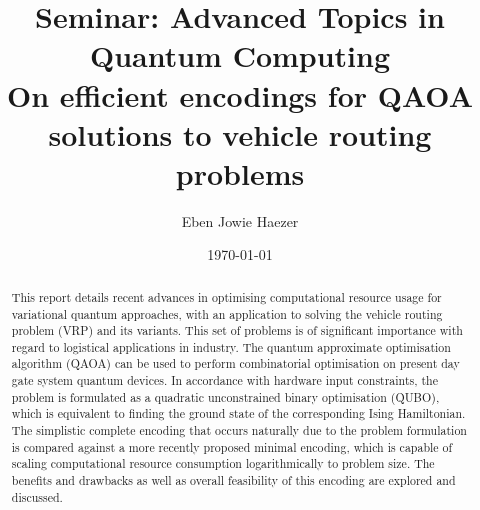 \documentclass [10pt]{article}
\title {
	{\Large Seminar: Advanced Topics in Quantum Computing \\}
	\vspace {0.4cm}
	On efficient encodings for QAOA \\
	solutions to vehicle routing problems
}
\author {Eben Jowie Haezer}
\date {\today}
\begin{document}
\vspace* {-1.8cm}
{\let \newpage \relax \maketitle}

\begin {abstract}
This report details recent advances in optimising computational resource usage
for variational quantum approaches, with an application to solving the vehicle
routing problem (VRP) and its variants. This set of problems is of significant
importance with regard to logistical applications in industry. The quantum
approximate optimisation algorithm (QAOA) can be used to perform combinatorial
optimisation on present day gate system quantum devices. In accordance with
hardware input constraints, the problem is formulated as a quadratic
unconstrained binary optimisation (QUBO), which is equivalent to finding the
ground state of the corresponding Ising Hamiltonian. The simplistic complete
encoding that occurs naturally due to the problem formulation is compared
against a more recently proposed minimal encoding, which is capable of scaling
computational resource consumption logarithmically to problem size. The
benefits and drawbacks as well as overall feasibility of this encoding are
explored and discussed.
\end {abstract}

\vspace {0.3cm}
\end{document}

